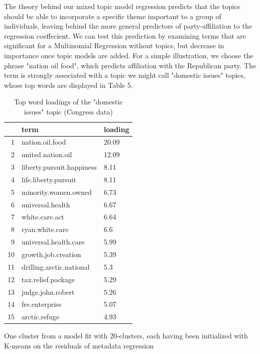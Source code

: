 \documentclass[12pt]{article}
\begin{document}
The theory behind our mixed topic model regression predicts that the topics should be able to incorporate a specific theme important to a group of individuals, leaving behind the more general predictors of party-affiliation to the regression coeffecient.
We can test this prediction by examining terms that are significant for a Multinomial Regression without topics, but decrease in importance once topic models are added. For a simple illustration, we choose the phrase "nation oil food", which predicts affiliation with the Republican party.  The term is strongly associated with a topic we might call "domestic issues" topics, whose top words are displayed in Table 5.





\begin{table}[ht]
\centering
\begin{threeparttable}
\caption{Top word loadings of the "domestic issues" topic (Congress data)}
\begin{tabular}{rll}
  \hline
 & term & loading \\ 
  \hline
1 & nation.oil.food & 20.09 \\ 
  2 & united.nation.oil & 12.09 \\ 
  3 & liberty.pursuit.happiness & 8.11 \\ 
  4 & life.liberty.pursuit & 8.11 \\ 
  5 & minority.women.owned & 6.73 \\ 
  6 & universal.health & 6.67 \\ 
  7 & white.care.act & 6.64 \\ 
  8 & ryan.white.care & 6.6 \\ 
  9 & universal.health.care & 5.99 \\ 
  10 & growth.job.creation & 5.39 \\ 
  11 & drilling.arctic.national & 5.3 \\ 
  12 & tax.relief.package & 5.29 \\ 
  13 & judge.john.robert & 5.26 \\ 
  14 & fre.enterprise & 5.07 \\ 
  15 & arctic.refuge & 4.93 \\ 
   \hline
\end{tabular}
\begin{tablenotes}
\small
\item One cluster from a model fit with 20-clusters, each having been initialized with K-means on the residuals of metadata regression
\end{tablenotes}
\end{threeparttable}
\end{table}
\end{document}
